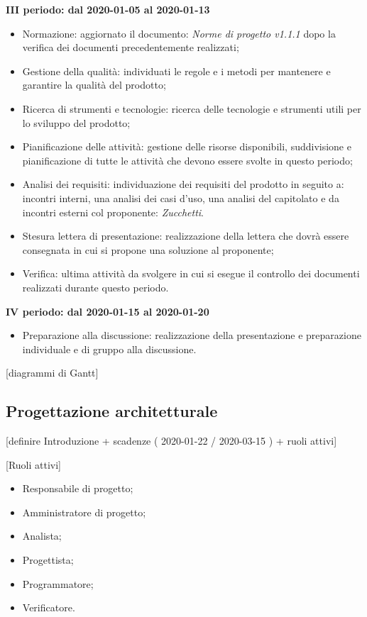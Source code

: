 \textbf{III periodo: dal 2020-01-05 al 2020-01-13}
\begin{itemize}
	\item Normazione: aggiornato il documento: \textit{Norme di progetto v1.1.1} dopo la verifica dei documenti precedentemente realizzati;
	\item Gestione della qualità: individuati le regole e i metodi per mantenere e garantire la qualità del prodotto;
	\item Ricerca di strumenti e tecnologie: ricerca delle tecnologie e strumenti utili per lo sviluppo del prodotto;
	\item Pianificazione delle attività: gestione delle risorse disponibili, suddivisione e pianificazione di tutte le attività che devono essere svolte in questo periodo;
	\item Analisi dei requisiti: individuazione dei requisiti del prodotto in seguito a: incontri interni, una analisi dei casi d'uso, una analisi del capitolato e da incontri esterni col proponente: \textit{Zucchetti}.
	\item Stesura lettera di presentazione: realizzazione della lettera che dovrà essere consegnata in cui si propone una soluzione al proponente;
	\item Verifica: ultima attività da svolgere in cui si esegue il controllo dei documenti realizzati durante questo periodo.
\end{itemize}

\textbf{IV periodo: dal 2020-01-15 al 2020-01-20}
\begin{itemize}
	\item Preparazione alla discussione: realizzazione della presentazione e preparazione individuale e di gruppo alla discussione.
\end{itemize}

[diagrammi di Gantt]

\subsection{Progettazione architetturale}
[definire Introduzione + scadenze ( 2020-01-22 / 2020-03-15 ) + ruoli attivi]

[Ruoli attivi]
\begin{itemize}
	\item Responsabile di progetto;
	\item Amministratore di progetto;
	\item Analista;
	\item Progettista;
	\item Programmatore;
	\item Verificatore.
\end{itemize}

